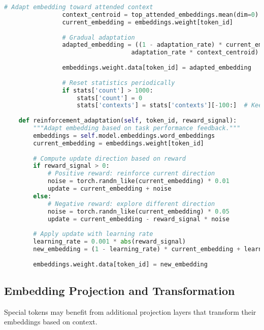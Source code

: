 \begin{lstlisting}[language=Python, caption=Dynamic adaptation of special token embeddings]
                # Adapt embedding toward attended context
                context_centroid = top_attended_embeddings.mean(dim=0)
                current_embedding = embeddings.weight[token_id]
                
                # Gradual adaptation
                adapted_embedding = ((1 - adaptation_rate) * current_embedding + 
                                   adaptation_rate * context_centroid)
                
                embeddings.weight.data[token_id] = adapted_embedding
                
                # Reset statistics periodically
                if stats['count'] > 1000:
                    stats['count'] = 0
                    stats['contexts'] = stats['contexts'][-100:]  # Keep recent history
                    
    def reinforcement_adaptation(self, token_id, reward_signal):
        """Adapt embedding based on task performance feedback."""
        embeddings = self.model.embeddings.word_embeddings
        current_embedding = embeddings.weight[token_id]
        
        # Compute update direction based on reward
        if reward_signal > 0:
            # Positive reward: reinforce current direction
            noise = torch.randn_like(current_embedding) * 0.01
            update = current_embedding + noise
        else:
            # Negative reward: explore different direction
            noise = torch.randn_like(current_embedding) * 0.05
            update = current_embedding - reward_signal * noise
            
        # Apply update with learning rate
        learning_rate = 0.001 * abs(reward_signal)
        new_embedding = (1 - learning_rate) * current_embedding + learning_rate * update
        
        embeddings.weight.data[token_id] = new_embedding
\end{lstlisting}

\subsection{Embedding Projection and Transformation}

Special tokens may benefit from additional projection layers that transform their embeddings based on context.

